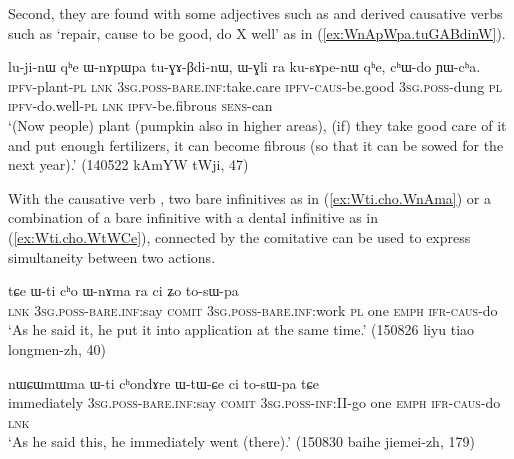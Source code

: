 Second, they are found with some adjectives such as  and derived causative verbs such as  `repair, cause to be good, do X well' as in (\ref{ex:WnApWpa.tuGABdinW}).

\begin{exe} 
\ex \label{ex:WnApWpa.tuGABdinW}
\gll lu-ji-nɯ qʰe ɯ-nɤpɯpa tu-ɣɤ-βdi-nɯ, ɯ-ɣli ra ku-sɤpe-nɯ qʰe, cʰɯ-do ɲɯ-cʰa. \\
\textsc{ipfv}-plant-\textsc{pl} \textsc{lnk} \textsc{3sg}.\textsc{poss}-\textsc{bare}.\textsc{inf}:take.care \textsc{ipfv}-\textsc{caus}-be.good \textsc{3sg}.\textsc{poss}-dung \textsc{pl} \textsc{ipfv}-do.well-\textsc{pl} \textsc{lnk} \textsc{ipfv}-be.fibrous \textsc{sens}-can \\
\glt `(Now people) plant (pumpkin also in higher areas), (if) they take good care of it and put enough fertilizers, it can become fibrous (so that it can be sowed for the next year).' (140522 kAmYW tWji, 47)
\end{exe} 

With the causative verb , two bare infinitives as in (\ref{ex:Wti.cho.WnAma}) or a combination of a bare infinitive with a dental infinitive as in (\ref{ex:Wti.cho.WtWCe}), connected by the comitative  can be used to express simultaneity between two actions.

\begin{exe} 
\ex \label{ex:Wti.cho.WnAma}
\gll tɕe ɯ-ti cʰo ɯ-nɤma ra ci ʑo to-sɯ-pa \\
\textsc{lnk} \textsc{3sg}.\textsc{poss}-\textsc{bare}.\textsc{inf}:say \textsc{comit} \textsc{3sg}.\textsc{poss}-\textsc{bare}.\textsc{inf}:work \textsc{pl} one \textsc{emph} \textsc{ifr}-\textsc{caus}-do \\
\glt `As he said it, he put it into application at the same time.' (150826 liyu tiao longmen-zh, 40)
\end{exe} 

\begin{exe} 
\ex \label{ex:Wti.cho.WtWCe}  
\gll  nɯɕɯmɯma ɯ-ti cʰondɤre ɯ-tɯ-ɕe ci to-sɯ-pa tɕe \\
immediately \textsc{3sg}.\textsc{poss}-\textsc{bare}.\textsc{inf}:say \textsc{comit} \textsc{3sg}.\textsc{poss}-\textsc{inf:II}-go  one \textsc{emph} \textsc{ifr}-\textsc{caus}-do \textsc{lnk} \\
\glt `As he said this, he immediately went (there).' (150830 baihe jiemei-zh, 179)
\end{exe} 

